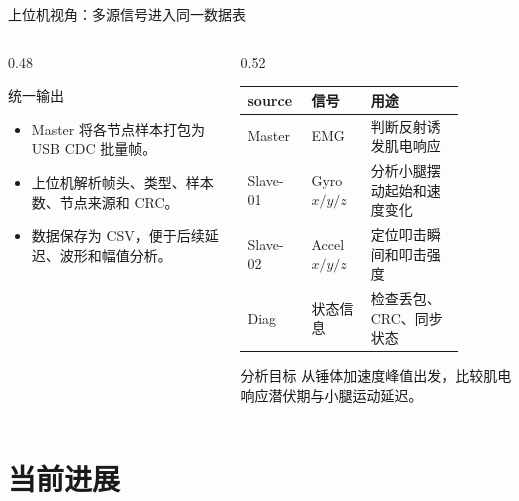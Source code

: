 \documentclass[aspectratio=169,fontset=none]{ctexbeamer}
\begin{document}
\begin{frame}{上位机视角：多源信号进入同一数据表}
  \begin{columns}
    \begin{column}{0.48\textwidth}
      \begin{block}{统一输出}
        \begin{itemize}
          \item Master 将各节点样本打包为 USB CDC 批量帧。
          \item 上位机解析帧头、类型、样本数、节点来源和 CRC。
          \item 数据保存为 CSV，便于后续延迟、波形和幅值分析。
        \end{itemize}
      \end{block}
    \end{column}
    \begin{column}{0.52\textwidth}
      \begin{table}
        \centering
        \small
        \scriptsize
        \begin{tabular}{p{0.18\linewidth}p{0.24\linewidth}p{0.38\linewidth}}
          \toprule
          source & 信号 & 用途 \\
          \midrule
          Master & EMG & 判断反射诱发肌电响应 \\
          Slave-01 & Gyro $x/y/z$ & 分析小腿摆动起始和速度变化 \\
          Slave-02 & Accel $x/y/z$ & 定位叩击瞬间和叩击强度 \\
          Diag & 状态信息 & 检查丢包、CRC、同步状态 \\
          \bottomrule
        \end{tabular}
      \end{table}
      \vspace{0.1cm}
      \begin{block}{分析目标}
        从锤体加速度峰值出发，比较肌电响应潜伏期与小腿运动延迟。
      \end{block}
    \end{column}
  \end{columns}
\end{frame}

\section{当前进展}
\end{document}
